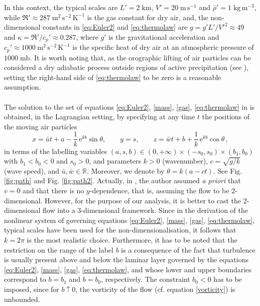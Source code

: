 \documentclass[reqno]{amsart}
\begin{document}
In this context, the typical scales are $L'=2\;\mathrm{km}$, $V'=20\;\mathrm{m\,s^{-1}}$ and $\bar\rho'=1\;\mathrm{kg\,m^{-3}}$, while $\mathfrak R'\approx 287\;\mathrm{m^2\,s^{-2}\,K^{-1}}$ is the gas constant for dry air, and, the non-dimensional constants in \eqref{eq:Euler2} and \eqref{eq:thermolaw} are $g = g'{L'}/{V'^2} \approx 49$ and  $\kappa = {\mathfrak R'}/{c_p'} \approx 0.287$,
where $g'$ is the gravitational acceleration and $c_p'\approx 1000\;\mathrm{m^2\,s^{-2}\,K^{-1}}$ is the specific heat of dry air at an atmospheric pressure of $1000\;\mathrm{mb}$. It is worth noting that, as the orographic lifting of air particles can be considered a dry adiabatic process outside regions of active precipitation (see \cite{20}), setting the right-hand side of \eqref{eq:thermolaw} to be zero is a reasonable assumption.\\
\\
The solution to the set of equations \eqref{eq:Euler2}, \eqref{mass}, \eqref{gas}, \eqref{eq:thermolaw} in \cite{ConstantinMountain2023} is obtained, in the Lagrangian setting, by specifying at any time $t$ the positions of the moving air particles
                \begin{equation} \label{solution}
                x  =\bar{u} t + a - \frac{1}{k}\,\mathrm{e}^{kb}\sin\theta,\qquad
                y=s,\qquad
                z =\bar{w} t + b + \frac{1}{k}\,\mathrm{e}^{kb}\cos\theta\,, \end{equation}
		in terms of the labelling variables $(a,s,b)\in(0,+\infty)\times(-s_0,s_0)\times (b_1,b_0)$ with $b_1<b_0<0$ and $s_0>0$, and parameters $k>0$ (wavenumber), $c=\sqrt{g/k}$ (wave speed), and $\bar{u}, \bar{w}  \in\boldsymbol{\mathbb{R}}$. Moreover,  we denote by    $\theta=k(a-ct)$.  See Fig. \ref{fig:path} and Fig. \ref{fig:path2}. Actually, in \cite{ConstantinMountain2023}, the author assumed \emph{a priori} that $v=0$ and that there is no $y$-dependence, that is, assuming the flow to be 2-dimensional.  However, for the purpose of our analysis, it is better to cast the 2-dimensional flow into a 3-dimensional framework.  Since in the derivation of the nonlinear system of governing equations \eqref{eq:Euler2}, \eqref{mass}, \eqref{gas}, \eqref{eq:thermolaw}, typical scales have been used for the non-dimensionalisation, it follows that $k=2\pi$ is the most realistic choice. Furthermore, it has to be noted that the restriction on the range of the label $b$ is a consequence of the fact that turbulence is usually present above and below the laminar layer governed by the equations  \eqref{eq:Euler2}, \eqref{mass}, \eqref{gas}, \eqref{eq:thermolaw}, and whose lower and upper boundaries correspond to $b=b_1$ and $b=b_0$, respectively. The constraint $b_0<0$ has to be imposed, since for $b\uparrow 0$, the vorticity of the flow (cf. equation \eqref{vorticity})        is unbounded. 
\end{document}
